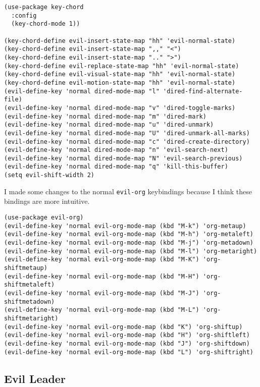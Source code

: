 \documentclass{article}
\begin{document}
\begin{verbatim}
(use-package key-chord
  :config
  (key-chord-mode 1))

(key-chord-define evil-insert-state-map "hh" 'evil-normal-state)
(key-chord-define evil-insert-state-map ",," "<")
(key-chord-define evil-insert-state-map ".." ">")
(key-chord-define evil-replace-state-map "hh" 'evil-normal-state)
(key-chord-define evil-visual-state-map "hh" 'evil-normal-state)
(key-chord-define evil-motion-state-map "hh" 'evil-normal-state)
(evil-define-key 'normal dired-mode-map "l" 'dired-find-alternate-file)
(evil-define-key 'normal dired-mode-map "v" 'dired-toggle-marks)
(evil-define-key 'normal dired-mode-map "m" 'dired-mark)
(evil-define-key 'normal dired-mode-map "u" 'dired-unmark)
(evil-define-key 'normal dired-mode-map "U" 'dired-unmark-all-marks)
(evil-define-key 'normal dired-mode-map "c" 'dired-create-directory)
(evil-define-key 'normal dired-mode-map "n" 'evil-search-next)
(evil-define-key 'normal dired-mode-map "N" 'evil-search-previous)
(evil-define-key 'normal dired-mode-map "q" 'kill-this-buffer)
(setq evil-shift-width 2)
\end{verbatim}

I made some changes to the normal \texttt{evil-org} keybindings because I think these bindings are more intuitive.

\begin{verbatim}
(use-package evil-org)
(evil-define-key 'normal evil-org-mode-map (kbd "M-k") 'org-metaup)
(evil-define-key 'normal evil-org-mode-map (kbd "M-h") 'org-metaleft)
(evil-define-key 'normal evil-org-mode-map (kbd "M-j") 'org-metadown)
(evil-define-key 'normal evil-org-mode-map (kbd "M-l") 'org-metaright)
(evil-define-key 'normal evil-org-mode-map (kbd "M-K") 'org-shiftmetaup)
(evil-define-key 'normal evil-org-mode-map (kbd "M-H") 'org-shiftmetaleft)
(evil-define-key 'normal evil-org-mode-map (kbd "M-J") 'org-shiftmetadown)
(evil-define-key 'normal evil-org-mode-map (kbd "M-L") 'org-shiftmetaright)
(evil-define-key 'normal evil-org-mode-map (kbd "K") 'org-shiftup)
(evil-define-key 'normal evil-org-mode-map (kbd "H") 'org-shiftleft)
(evil-define-key 'normal evil-org-mode-map (kbd "J") 'org-shiftdown)
(evil-define-key 'normal evil-org-mode-map (kbd "L") 'org-shiftright)
\end{verbatim}

\subsection{Evil Leader}
\label{sec-7-4}
\end{document}
